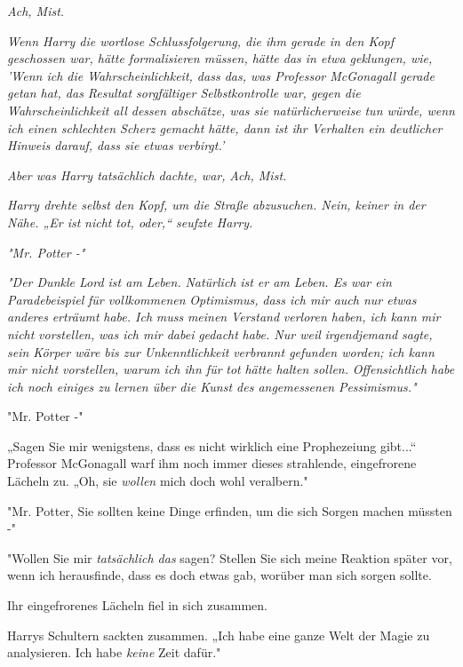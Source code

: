 {\emph{\emph{Ach, Mist.}}

\emph{Wenn Harry die wortlose Schlussfolgerung, die ihm gerade in den Kopf geschossen war, hätte formalisieren müssen, hätte das in etwa geklungen, wie, 'Wenn ich die Wahrscheinlichkeit, dass das, was Professor McGonagall gerade getan hat, das Resultat sorgfältiger Selbstkontrolle war, gegen die Wahrscheinlichkeit all dessen abschätze, was sie} \emph{\emph{natürlicherweise}} \emph{tun würde, wenn ich einen schlechten Scherz gemacht hätte, dann ist ihr Verhalten ein deutlicher Hinweis darauf, dass sie etwas verbirgt.'}

\emph{Aber was Harry tatsächlich dachte, war,} \emph{\emph{Ach, Mist.}}

\emph{Harry drehte selbst den Kopf, um die Straße abzusuchen. Nein, keiner in der Nähe. „Er ist} \emph{\emph{nicht}} \emph{tot, oder,“ seufzte Harry.}

\emph{"Mr. Potter -"}

\emph{"Der Dunkle Lord ist am Leben.} \emph{\emph{Natürlich}} \emph{ist er am Leben. Es war ein} \emph{\emph{Paradebeispiel}} \emph{für vollkommenen} \emph{\emph{Optimismus,}} \emph{dass ich mir auch nur etwas anderes} \emph{\emph{erträumt}} \emph{habe. Ich} \emph{\emph{muss}} \emph{meinen} \emph{\emph{Verstand}} \emph{verloren haben, ich kann mir nicht} \emph{\emph{vorstellen,}} \emph{was ich mir dabei} \emph{\emph{gedacht}} \emph{habe. Nur weil} \emph{\emph{irgendjemand}} \emph{sagte, sein Körper wäre bis zur} \emph{\emph{Unkenntlichkeit}} \emph{verbrannt gefunden worden; ich kann mir nicht vorstellen, warum ich ihn für} \emph{\emph{tot}} \emph{hätte halten sollen.} \emph{\emph{Offensichtlich}} \emph{habe ich noch einiges zu lernen über die Kunst des angemessenen} \emph{\emph{Pessimismus.}"}

"Mr. Potter -"

„Sagen Sie mir wenigstens, dass es nicht wirklich eine Prophezeiung gibt...“ Professor McGonagall warf ihm noch immer dieses strahlende, eingefrorene Lächeln zu. „Oh, sie \emph{wollen} mich doch wohl veralbern."

"Mr. Potter, Sie sollten keine Dinge erfinden, um die sich Sorgen machen müssten -"

"Wollen Sie mir \emph{tatsächlich das} sagen? Stellen Sie sich meine Reaktion später vor, wenn ich herausfinde, dass es doch etwas gab, worüber man sich sorgen sollte.

Ihr eingefrorenes Lächeln fiel in sich zusammen.

Harrys Schultern sackten zusammen. „Ich habe eine ganze Welt der Magie zu analysieren. Ich habe \emph{keine} Zeit dafür."

}
